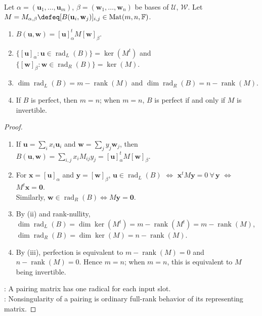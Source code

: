 \begin{proposition} \label{prop:bilinear-pairing-matrix-and-radicals} \\
Let $\alpha=(\mathbf{u}_1,\ldots,\mathbf{u}_m)$, $\beta=(\mathbf{w}_1,\ldots,\mathbf{w}_n)$ be bases of $\mathcal{U}$, $\mathcal{W}$. Let $M=M_{\alpha,\beta}\defeq [B(\mathbf{u}_i,\mathbf{w}_j)]_{i,j}\in\operatorname{Mat}(m,n,\mathbb{F})$.
\begin{enumerate}[label=(\roman*)]
\setlength{\itemsep}{0pt}
\item $B(\mathbf{u},\mathbf{w})=[\mathbf{u}]_{\alpha}^{t}M[\mathbf{w}]_{\beta}$.
\item $\{[\mathbf{u}]_{\alpha}:\mathbf{u}\in\operatorname{rad}_L(B)\}=\ker(M^t)$ and $\{[\mathbf{w}]_{\beta}:\mathbf{w}\in\operatorname{rad}_R(B)\}=\ker(M)$.
\item $\dim\operatorname{rad}_L(B)=m-\operatorname{rank}(M)$ and $\dim\operatorname{rad}_R(B)=n-\operatorname{rank}(M)$.
\item If $B$ is perfect, then $m=n$; when $m=n$, $B$ is perfect if and only if $M$ is invertible.
\end{enumerate}
\begin{proof}
\begin{enumerate}[label=(\roman*)]
\setlength{\itemsep}{0pt}
\item If $\mathbf{u}=\sum_i x_i\mathbf{u}_i$ and $\mathbf{w}=\sum_j y_j\mathbf{w}_j$, then $B(\mathbf{u},\mathbf{w})=\sum_{i,j}x_iM_{ij}y_j=[\mathbf{u}]_{\alpha}^{t}M[\mathbf{w}]_{\beta}$.
\item For $\mathbf{x}=[\mathbf{u}]_{\alpha}$ and $\mathbf{y}=[\mathbf{w}]_{\beta}$, $\mathbf{u}\in\operatorname{rad}_L(B)$ $\Longleftrightarrow$ $\mathbf{x}^tM\mathbf{y}=0\ \forall\,\mathbf{y}$ $\Longleftrightarrow$ $M^t\mathbf{x}=\mathbf{0}$.\\
Similarly, $\mathbf{w}\in\operatorname{rad}_R(B)\Longleftrightarrow M\mathbf{y}=\mathbf{0}$.
\item By (ii) and rank-nullity, $\dim\operatorname{rad}_L(B)=\dim\ker(M^t)=m-\operatorname{rank}(M^t)=m-\operatorname{rank}(M)$,\\
$\dim\operatorname{rad}_R(B)=\dim\ker(M)=n-\operatorname{rank}(M)$.
\item By (iii), perfection is equivalent to $m-\operatorname{rank}(M)=0$ and $n-\operatorname{rank}(M)=0$. Hence $m=n$; when $m=n$, this is equivalent to $M$ being invertible.
\end{enumerate}
: A pairing matrix has one radical for each input slot.\\
: Nonsingularity of a pairing is ordinary full-rank behavior of its representing matrix.
\end{proof}
\end{proposition}

